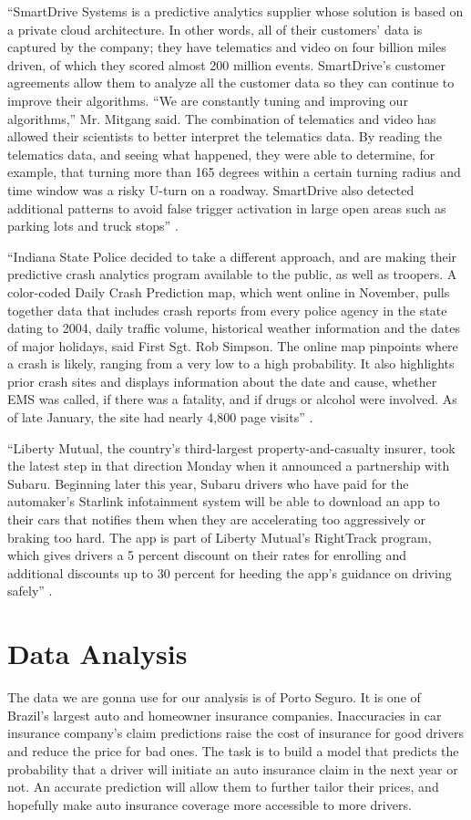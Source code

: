 ``SmartDrive Systems is a predictive analytics supplier whose solution is based on a private cloud architecture.  In other words, all of their customers’ data is captured by the company; they have telematics and video on four billion miles driven, of which they scored almost 200 million events.   SmartDrive’s customer agreements allow them to analyze all the customer data so they can continue to improve their algorithms.  “We are constantly tuning and improving our algorithms,” Mr. Mitgang said. The combination of telematics and video has allowed their scientists to better interpret the telematics data. By reading the telematics data, and seeing what happened, they were able to determine, for example, that turning more than 165 degrees within a certain turning radius and time window was a risky U-turn on a roadway. SmartDrive also detected additional patterns to avoid false trigger activation in large open areas such as parking lots and truck stops'' \cite{Banker2016accident}.

``Indiana State Police decided to take a different approach, and are making their predictive crash analytics program available to the public, as well as troopers. A color-coded Daily Crash Prediction map, which went online in November, pulls together data that includes crash reports from every police agency in the state dating to 2004, daily traffic volume, historical weather information and the dates of major holidays, said First Sgt. Rob Simpson. The online map pinpoints where a crash is likely, ranging from a very low to a high probability. It also highlights prior crash sites and displays information about the date and cause, whether EMS was called, if there was a fatality, and if drugs or alcohol were involved. As of late January, the site had nearly 4,800 page visits'' \cite{Bergal2017sites}.

``Liberty Mutual, the country's third-largest property-and-casualty insurer, took the latest step in that direction Monday when it announced a partnership with Subaru. Beginning later this year, Subaru drivers who have paid for the automaker's Starlink infotainment system will be able to download an app to their cars that notifies them when they are accelerating too aggressively or braking too hard. The app is part of Liberty Mutual's RightTrack program, which gives drivers a 5 percent discount on their rates for enrolling and additional discounts up to 30 percent for heeding the app's guidance on driving safely'' \cite{Fung2016turn}. 

\section{Data Analysis}
The data we are gonna use for our analysis is of Porto Seguro. It is one of Brazil's largest auto and homeowner insurance companies. Inaccuracies in car insurance company's claim predictions raise the cost of insurance for good drivers and reduce the price for bad ones. The task is to build a model that predicts the probability that a driver will initiate an auto insurance claim in the next year or not. An accurate prediction will allow them to further tailor their prices, and hopefully make auto insurance coverage more accessible to more drivers. 
\\
